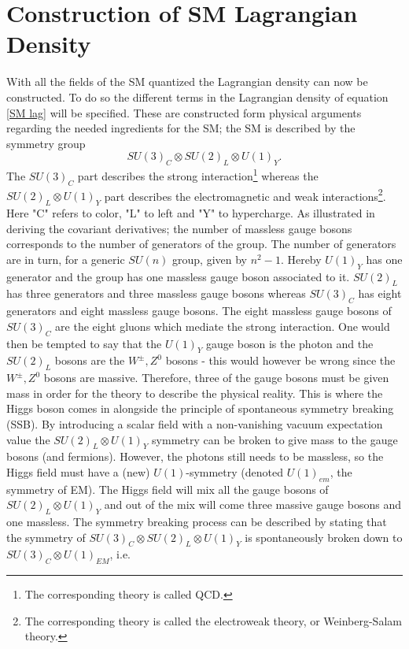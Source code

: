 \section{Construction of SM Lagrangian Density}
With all the fields of the SM quantized the Lagrangian density can now be constructed. To do so the different terms in the Lagrangian density of equation \eqref{SM lag} will be specified. These are constructed form physical arguments regarding the needed ingredients for the SM; the SM is described by the symmetry group
\begin{equation}
	SU(3)_{C}\otimes SU(2)_L\otimes U(1)_Y.
\end{equation} 
The $SU(3)_{C}$ part describes the strong interaction\footnote{The corresponding theory is called QCD.} whereas the $SU(2)_L\otimes U(1)_Y$ part describes the electromagnetic and weak interactions\footnote{The corresponding theory is called the electroweak theory, or Weinberg-Salam theory.}. Here "C" refers to color, "L" to left and "Y" to hypercharge.  As illustrated in deriving the covariant derivatives; the number of massless gauge bosons corresponds to the number of generators of the group. The number of generators are in turn, for a generic $SU(n)$ group, given by $n^2-1$. Hereby $U(1)_Y$ has one generator and the group has one massless gauge boson associated to it. $SU(2)_L$ has three generators and three massless gauge bosons whereas $SU(3)_{C}$ has eight generators and eight massless gauge bosons. The eight massless gauge bosons of $SU(3)_{C}$ are the eight gluons which mediate the strong interaction. One would then be tempted to say that the $U(1)_Y$ gauge boson is the photon and the $SU(2)_L$ bosons are the $W^{\pm},Z^0$ bosons - this would however be wrong since the $W^{\pm},Z^0$ bosons are massive.
Therefore, three of the gauge bosons must be given mass in order for the theory to describe the physical reality. This is where the Higgs boson comes in alongside the principle of spontaneous symmetry breaking (SSB). By introducing a scalar field with a non-vanishing vacuum expectation value the $SU(2)_L\otimes U(1)_Y$ symmetry can be broken to give mass to the gauge bosons (and fermions). However, the photons still needs to be massless, so the Higgs field must have a (new) $U(1)$-symmetry (denoted $U(1)_{em}$, the symmetry of EM). The Higgs field will mix all the gauge bosons of $SU(2)_L\otimes U(1)_Y$ and out of the mix will come three massive gauge bosons and one massless. The symmetry breaking process can be described by stating that the symmetry of $SU(3)_{C}\otimes SU(2)_L\otimes U(1)_Y$ is spontaneously broken down to $SU(3)_{C}\otimes U(1)_{EM}$,  i.e.
